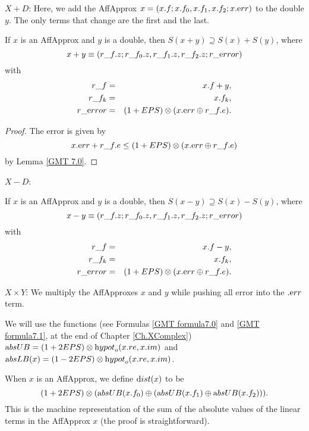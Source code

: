 $X + D$: 
Here, we add the AffApprox $x = (x.f; x.f_0,x.f_1,x.f_2; x.{\textrm err})$  to the double $y$.  The only terms that change are the first and the last.

\begin{proposition}\label{GMT prop8.4}\hskip-5pt If $x$ is an 
{\textrm AffApprox}  and $y$ is a double{\textrm ,} 
then $S(x + y) \supseteq S(x) + S(y)${\textrm ,} where
$$x + y \equiv (r\_f.z; r\_f_0.z, r\_f_1.z, r\_f_2.z; r\_{\textrm error})$$
with
\begin{eqnarray*}
r\_f& =& x.f + y,\\
r\_f_k &=& x.f_k,\\
r\_{\textrm error}& = &(1 + EPS) \otimes (x.{\textrm err} \oplus r\_f.e).\end{eqnarray*}
\end{proposition}

\begin{proof}{}
The error is given by 
$$x.{\textrm err} + r\_f.e \le (1 + EPS) \otimes (x.{\textrm err} \oplus r\_f.e)$$
by Lemma \ref{GMT 7.0}. \end{proof}

$X - D$:
\begin{proposition}\label{GMT prop8.5}\hskip-5pt If $x$ is an 
{\textrm AffApprox}  and $y$ is a double{\textrm ,}
then $S(x - y) \supseteq S(x) - S(y)${\textrm ,} where
$$x - y \equiv (r\_f.z; r\_f_0.z, r\_f_1.z, r\_f_2.z; r\_{\textrm error})$$
with
\begin{eqnarray*}
r\_f &= &x.f - y,\\
r\_f_k &=& x.f_k,\\
r\_{\textrm error}& =& (1 + EPS) \otimes (x.{\textrm err} \oplus r\_f.e).\end{eqnarray*}
\end{proposition}

$X \times Y$: 
We multiply the AffApproxes $x$ and $y$ while pushing all error into the $.{\textrm err}$ term.

We will use the functions (see Formulas \ref{GMT formula7.0} and \ref{GMT formula7.1}, at the end of Chapter \ref{Ch.XComplex}) ${\textrm absUB}= (1 + 2EPS) \otimes
{\textrm hypot}_o(x.re,x.im)$ and 
${\textrm absLB}(x) = (1 - 2EPS) \otimes {\textrm hypot}_o(x.re,x.im)$.

When $x$ is an AffApprox, we define ${\textrm dist}(x)$ to be $$(1 + 2EPS) \otimes ({\textrm absUB}(x.f_0) \oplus ({\textrm absUB}(x.f_1) \oplus {\textrm absUB}(x.f_2))).$$  This is the machine representation of the sum of the absolute values of the linear terms in the AffApprox $x$ 
(the proof is straightforward).

